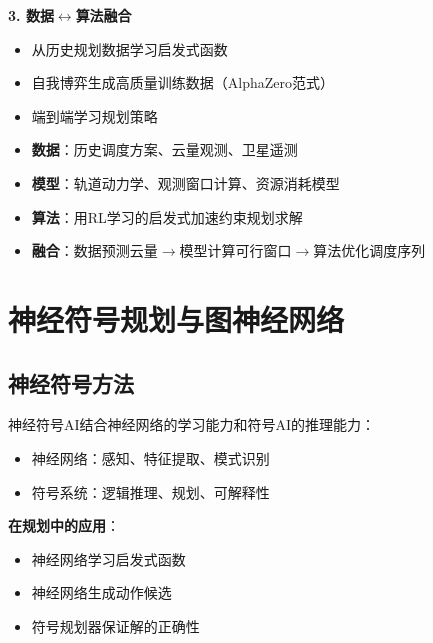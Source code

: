 \textbf{3. 数据$\leftrightarrow$算法融合}
\begin{itemize}[leftmargin=2em]
  \item 从历史规划数据学习启发式函数
  \item 自我博弈生成高质量训练数据（AlphaZero范式）
  \item 端到端学习规划策略
\end{itemize}

\begin{appbox}
\begin{itemize}
  \item \textbf{数据}：历史调度方案、云量观测、卫星遥测
  \item \textbf{模型}：轨道动力学、观测窗口计算、资源消耗模型
  \item \textbf{算法}：用RL学习的启发式加速约束规划求解
  \item \textbf{融合}：数据预测云量$\rightarrow$模型计算可行窗口$\rightarrow$算法优化调度序列
\end{itemize}
\end{appbox}

\section{神经符号规划与图神经网络}

\subsection{神经符号方法}

\begin{definition}[神经符号AI]
神经符号AI结合神经网络的学习能力和符号AI的推理能力：
\begin{itemize}
  \item 神经网络：感知、特征提取、模式识别
  \item 符号系统：逻辑推理、规划、可解释性
\end{itemize}
\end{definition}

\textbf{在规划中的应用}：
\begin{itemize}[leftmargin=2em]
  \item 神经网络学习启发式函数
  \item 神经网络生成动作候选
  \item 符号规划器保证解的正确性
\end{itemize}

